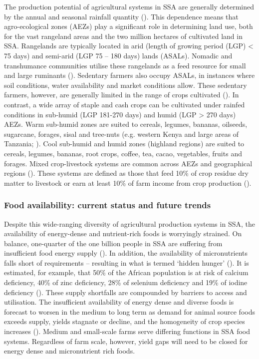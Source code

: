 The production potential of agricultural systems in SSA are generally determined by the annual and seasonal rainfall quantity (\citealp{VanOort2016}). This dependence means that agro-ecological zones (AEZs) play a significant role in determining land use, both for the vast rangeland areas and the two million hectares of cultivated land in SSA. Rangelands are typically located in arid (length of growing period (LGP) {\textless} 75 days) and semi-arid (LGP 75 -- 180 days) lands (ASALs). Nomadic and transhumance communities utilise these rangelands as a feed resource for small and large ruminants (\citealp{Sere1996}). Sedentary farmers also occupy ASALs, in instances where soil conditions, water availability and market conditions allow. These sedentary farmers, however, are generally limited in the range of crops cultivated (\citealp{USAID2012, Little2001}). In contrast, a wide array of staple and cash crops can be cultivated under rainfed conditions in sub-humid (LGP 181-270 days) and humid (LGP {\textgreater} 270 days) AEZs. Warm sub-humid zones are suited to cereals, legumes, bananas, oilseeds, sugarcane, forages, sisal and tree-nuts (e.g. western Kenya and large areas of Tanzania; \citealp{USAID2012, USAID2009}). Cool sub-humid and humid zones (highland regions) are suited to cereals, legumes, bananas, root crops, coffee, tea, cacao, vegetables, fruits and forages. Mixed crop-livestock systems are common across AEZs and geographical regions (\citealp{B.D.PerryT.F.Randolph2002}). These systems are defined as those that feed 10\% of crop residue dry matter to livestock or earn at least 10\% of farm income from crop production (\citealp{Sere1996}).

\subsubsection{Food availability: current status and future trends}

Despite this wide-ranging diversity of agricultural production systems in SSA, the availability of energy-dense and nutrient-rich foods is worryingly strained. On balance, one-quarter of the one billion people in SSA are suffering from insufficient food energy supply (\citealp{FAO2018}). In addition, the availability of micronutrients falls short of requirements -- resulting in what is termed `hidden hunger' (\citealp{Joy2014, Kumssa2015, Harika2017}). It is estimated, for example, that 50\% of the African population is at risk of calcium deficiency, 40\% of zinc deficiency, 28\% of selenium deficiency and 19\% of iodine deficiency (\citealp{Joy2014}). These supply shortfalls are compounded by barriers to access and utilisation. The insufficient availability of energy dense and diverse foods is forecast to worsen in the medium to long term as demand for animal source foods exceeds supply, yields stagnate or decline, and the homogeneity of crop species increases (\citealp{Enahoro2018, VanOort2016, Pingali2015}). Medium and small-scale farms serve differing functions in SSA food systems. Regardless of farm scale, however, yield gaps will need to be closed for energy dense and micronutrient rich foods.

